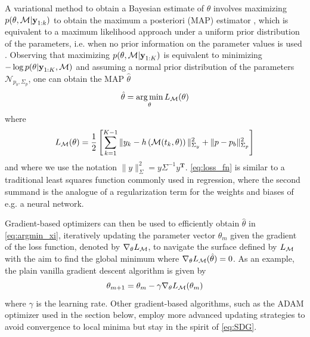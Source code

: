 A variational method to obtain a Bayesian estimate of $\theta$ involves maximizing $p(\theta, \mathcal{M} | \textbf{y}_{1:k})$ to obtain the maximum a posteriori (MAP) estimator \citep{Bocquet2019}, which is equivalent to a maximum likelihood approach under a uniform prior distribution of the parameters, i.e. when no prior information on the parameter values is used \citep{Schartau2017}. Observing that maximizing $p(\theta, \mathcal{M} | \textbf{y}_{1:K})$ is equivalent to minimizing $- \log p(\theta | \textbf{y}_{1:K}, \mathcal{M})$ and assuming a normal prior distribution of the parameters $\mathcal{N}_{p_b, \Sigma_p}$, one can obtain the MAP $\hat{\theta}$
\begin{equation}\label{eq:argmin_xi}
    \hat{\theta} = \operatorname*{arg\,min}_\theta  L_{\mathcal{M}}(\theta)
\end{equation}
%
where 
\begin{equation}\label{eq:loss_fn}
    \begin{split}
    L_{\mathcal{M}}(\theta) &= \frac{1}{2} \left[ \sum_{k=1}^{K-1} \|y_k - h\left(\mathcal{M}(t_k,\theta)\right)\|_{\Sigma_y}^2 + \|p - p_b\|_{\Sigma_p}^2 \right] \\
   \end{split}
\end{equation}
\citep{Schneider2017,Raue2009} and where we use the notation $\|y\|_\Sigma^2 = y \Sigma^{-1}y^{\textbf{T}}$.
%
\cref{eq:loss_fn} is similar to a traditional least squares function commonly used in regression, where the second summand is the analogue of a regularization term for the weights and biases of e.g. a neural network.

%
Gradient-based optimizers can then be used to efficiently obtain $\hat{\theta}$ in \cref{eq:argmin_xi}, iteratively updating the parameter vector $\theta_m$ given the gradient of the loss function, denoted by $\nabla_\theta L_{\mathcal{M}}$, to navigate the surface defined by $L_{\mathcal{M}}$ with the aim to find the global minimum where $\nabla_\theta L_{\mathcal{M}}(\hat{\theta}) = 0$. 
% 
As an example, the plain vanilla gradient descent algorithm is given by
\begin{equation}\label{eq:SDG}
    \theta_{m+1} = \theta_{m} - \gamma \nabla_\theta L_{\mathcal{M}}({\theta_m})
\end{equation}
where $\gamma$ is the learning rate. Other gradient-based algorithms, such as the ADAM optimizer used in the section below, employ more advanced updating strategies to avoid convergence to local minima but stay in the spirit of \cref{eq:SDG}.

